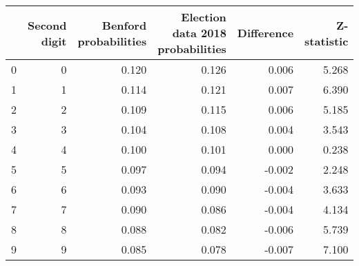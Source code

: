 \begin{tabular}{lrrrrr}
\toprule
{} &  Second digit &  Benford probabilities &  Election data 2018 probabilities &  Difference &  Z-statistic \\
\midrule
0 &             0 &                  0.120 &                             0.126 &       0.006 &        5.268 \\
1 &             1 &                  0.114 &                             0.121 &       0.007 &        6.390 \\
2 &             2 &                  0.109 &                             0.115 &       0.006 &        5.185 \\
3 &             3 &                  0.104 &                             0.108 &       0.004 &        3.543 \\
4 &             4 &                  0.100 &                             0.101 &       0.000 &        0.238 \\
5 &             5 &                  0.097 &                             0.094 &      -0.002 &        2.248 \\
6 &             6 &                  0.093 &                             0.090 &      -0.004 &        3.633 \\
7 &             7 &                  0.090 &                             0.086 &      -0.004 &        4.134 \\
8 &             8 &                  0.088 &                             0.082 &      -0.006 &        5.739 \\
9 &             9 &                  0.085 &                             0.078 &      -0.007 &        7.100 \\
\bottomrule
\end{tabular}
